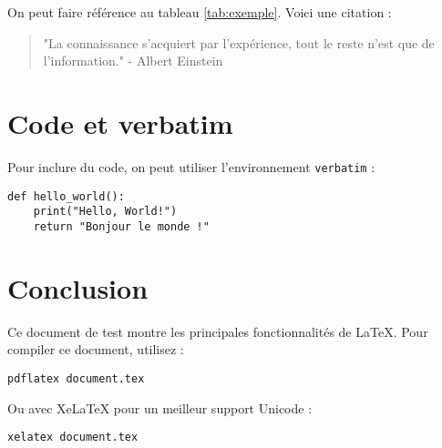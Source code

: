 \documentclass[12pt,a4paper]{article}
\begin{document}
On peut faire référence au tableau \ref{tab:exemple}. Voici une citation :

\begin{quote}
"La connaissance s'acquiert par l'expérience, tout le reste n'est que de l'information." - Albert Einstein
\end{quote}

\section{Code et verbatim}

Pour inclure du code, on peut utiliser l'environnement \texttt{verbatim} :

\begin{verbatim}
def hello_world():
    print("Hello, World!")
    return "Bonjour le monde !"
\end{verbatim}

\section{Conclusion}

Ce document de test montre les principales fonctionnalités de LaTeX. Pour compiler ce document, utilisez :

\texttt{pdflatex document.tex}

Ou avec XeLaTeX pour un meilleur support Unicode :

\texttt{xelatex document.tex}
\end{document}
